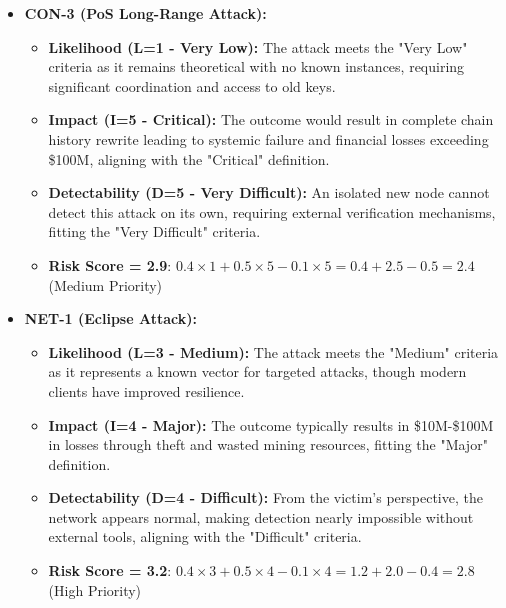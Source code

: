 \begin{itemize}
    \item \textbf{CON-3 (PoS Long-Range Attack):}
    \begin{itemize}
        \item \textbf{Likelihood (L=1 - Very Low):} The attack meets the "Very Low" criteria as it remains theoretical with no known instances, requiring significant coordination and access to old keys.
        \item \textbf{Impact (I=5 - Critical):} The outcome would result in complete chain history rewrite leading to systemic failure and financial losses exceeding \$100M, aligning with the "Critical" definition.
        \item \textbf{Detectability (D=5 - Very Difficult):} An isolated new node cannot detect this attack on its own, requiring external verification mechanisms, fitting the "Very Difficult" criteria.
        \item \textbf{Risk Score = 2.9}: $0.4 \times 1 + 0.5 \times 5 - 0.1 \times 5 = 0.4 + 2.5 - 0.5 = 2.4$ (Medium Priority)
    \end{itemize}

    \item \textbf{NET-1 (Eclipse Attack):}
    \begin{itemize}
        \item \textbf{Likelihood (L=3 - Medium):} The attack meets the "Medium" criteria as it represents a known vector for targeted attacks, though modern clients have improved resilience.
        \item \textbf{Impact (I=4 - Major):} The outcome typically results in \$10M-\$100M in losses through theft and wasted mining resources, fitting the "Major" definition.
        \item \textbf{Detectability (D=4 - Difficult):} From the victim's perspective, the network appears normal, making detection nearly impossible without external tools, aligning with the "Difficult" criteria.
        \item \textbf{Risk Score = 3.2}: $0.4 \times 3 + 0.5 \times 4 - 0.1 \times 4 = 1.2 + 2.0 - 0.4 = 2.8$ (High Priority)
    \end{itemize}
\end{itemize}